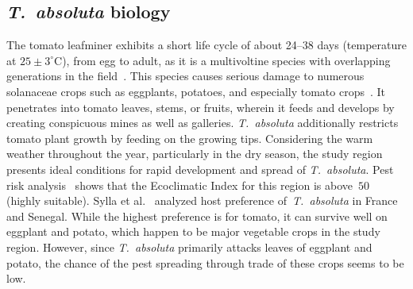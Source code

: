 \documentclass[11pt]{article}
\newcommand{\tuta}{\emph{T.~absoluta}}
\theoremstyle{definition}
\begin{document}
\subsection{\tuta{} biology}
\label{sec:biology}
The tomato leafminer exhibits a short life cycle of about 24--38 days
(temperature at $25\pm3^\circ$C), from egg to adult, as it is a
multivoltine species with overlapping generations in the
field~\cite{guedes2012tomato}. This species causes serious damage to
numerous solanaceae crops such as eggplants, potatoes, and especially
tomato crops~\cite{sylla2018}. It penetrates into tomato leaves, stems, or
fruits, wherein it feeds and develops by creating conspicuous mines as well
as galleries. \tuta{} additionally restricts tomato plant growth by feeding on
the growing tips. Considering the warm weather throughout the year,
particularly in the dry season, the study region presents ideal conditions
for rapid development and spread of \tuta{}. Pest risk
analysis~\cite{tonnang2015identification} shows that the Ecoclimatic Index
for this region is above~$50$ (highly suitable). Sylla et
al.~\cite{sylla2018} analyzed host preference of~\tuta{} in France and
Senegal. While the highest preference is for tomato, it can survive well on
eggplant and potato, which happen to be major vegetable crops in the study
region. However, since \tuta{} primarily attacks leaves of eggplant and
potato, the chance of the pest spreading through trade of these crops seems
to be low. 
\end{document}
